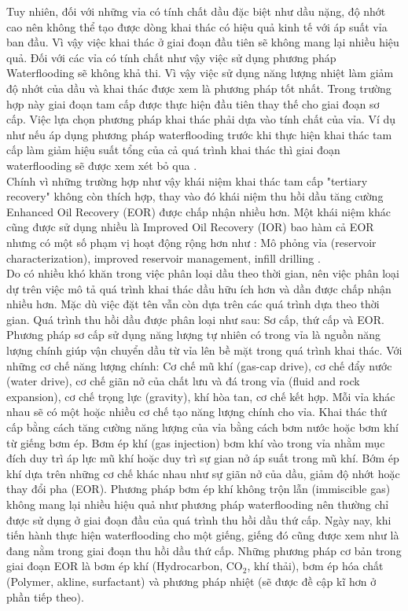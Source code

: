\documentclass[12pt,a4paper]{article}
\begin{document}
Tuy nhiên, đối với những vỉa có tính chất dầu đặc biệt như dầu nặng, độ nhớt cao nên không thể tạo được dòng khai thác có hiệu quả kinh tế với áp suất vỉa ban đầu. Vì vậy việc khai thác ở giai đoạn đầu tiên sẽ không mang lại nhiều hiệu quả. Đối với các vỉa có tính chất như vậy việc sử dụng phương pháp Waterflooding sẽ không khả thi. Vì vậy việc sử dụng năng lượng nhiệt làm giảm độ nhớt của dầu và khai thác được xem là phương pháp tốt nhất. Trong trường hợp này giai đoạn tam cấp được thực hiện đầu tiên thay thế cho giai đoạn sơ cấp. Việc lựa chọn phương pháp khai thác phải dựa vào tính chất của vỉa. Ví dụ như nếu áp dụng phương pháp waterflooding trước khi thực hiện khai thác tam cấp làm giảm hiệu suất tổng của cả quá trình khai thác thì giai đoạn waterflooding sẽ được xem xét bỏ qua \cite{green1998enhanced}.\\
Chính vì những trường hợp như vậy khái niệm khai thác tam cấp "tertiary  recovery" không còn thích hợp, thay vào đó khái niệm thu hồi dầu tăng cường Enhanced Oil Recovery (EOR) được chấp nhận nhiều hơn. Một khái niệm khác cũng được sử dụng nhiều là  Improved  Oil  Recovery  (IOR) bao hàm cả EOR nhưng có một số phạm vị hoạt động rộng hơn như : Mô phỏng vỉa (reservoir characterization), improved reservoir management, infill drilling \cite{green1998enhanced}.\\
Do có nhiều khó khăn trong việc phân loại dầu theo thời gian, nên việc phân loại dự trên việc mô tả quá trình khai thác dầu hữu ích hơn và dần được chấp nhận nhiều hơn. Mặc dù việc đặt tên vẫn còn dựa trên các quá trình dựa theo thời gian. Quá trình thu hồi dầu được phân loại như sau: Sơ cấp, thứ cấp và EOR.\\
Phương pháp sơ cấp sử dụng năng lượng tự nhiên có trong vỉa là nguồn năng lượng chính giúp vận chuyển dầu từ vỉa lên bề mặt trong quá trình khai thác. Với những cơ chế năng lượng chính:  Cơ chế mũ khí (gas-cap  drive), cơ chế đẩy nước (water drive), cơ chế giãn nở của chất lưu và đá trong vỉa (fluid  and  rock  expansion), cơ chế trọng lực (gravity), khí hòa tan, cơ chế kết hợp. Mỗi vỉa khác nhau sẽ có một hoặc nhiều cơ chế tạo năng lượng chính cho vỉa. Khai thác thứ cấp bằng cách tăng cường năng lượng của vỉa bằng cách bơm nước hoặc bơm khí từ giếng bơm ép. Bơm ép khí (gas injection) bơm khí vào trong vỉa nhằm mục đích duy trì áp lực mũ khí hoặc duy trì sự gian nở áp suất trong mũ khí. Bớm ép khí dựa trên những cơ chế khác nhau như sự giãn nở của dầu, giảm độ nhớt hoặc thay đổi pha (EOR). Phương pháp bơm ép khí không trộn lẫn (immiscible gas) không mang lại nhiều hiệu quả như phương pháp waterflooding nên thường chỉ được sử dụng ở giai đoạn đầu của quá trình thu hồi dầu thứ cấp. Ngày nay, khi tiến hành thực hiện waterflooding cho một giếng, giếng đó cũng được xem như là đang nằm trong giai đoạn thu hồi dầu thứ cấp. Những phương pháp cơ bản trong giai đoạn EOR là bơm ép khí (Hydrocarbon, CO$_2$, khí thải), bơm ép hóa chất (Polymer, akline, surfactant) và phương pháp nhiệt (sẽ được đề cập kĩ hơn ở phần tiếp theo).\\
\end{document}
